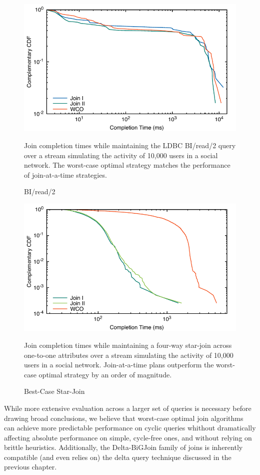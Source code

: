 \documentclass[../catalog.tex]{subfiles}
\begin{document}
\begin{figure}
  \centering
  \includegraphics[width=1.0\linewidth]{results/bi_read_2/out/all_cdfs}
  \caption{BI/read/2}
  \label{fig:average-cdfs}
  \medskip
  \small

  Join completion times while maintaining the LDBC BI/read/2 query
  over a stream simulating the activity of 10,000 users in a social
  network. The worst-case optimal strategy matches the performance of
  join-at-a-time strategies.
\end{figure}

\begin{figure}
  \centering
  \includegraphics[width=1.0\linewidth]{results/best_case/out/all_cdfs}
  \caption{Best-Case Star-Join}
  \label{fig:best-case-cdfs}
  \medskip
  \small

  Join completion times while maintaining a four-way star-join across
  one-to-one attributes over a stream simulating the activity of
  10,000 users in a social network. Join-at-a-time plans outperform
  the worst-case optimal strategy by an order of magnitude.
\end{figure}

While more extensive evaluation across a larger set of queries is
necessary before drawing broad conclusions, we believe that worst-case
optimal join algorithms can achieve more predictable performance on
cyclic queries whithout dramatically affecting absolute performance on
simple, cycle-free ones, and without relying on brittle
heuristics. Additionally, the Delta-BiGJoin family of joins is
inherently compatible (and even relies on) the delta query technique
discussed in the previous chapter.
\end{document}
